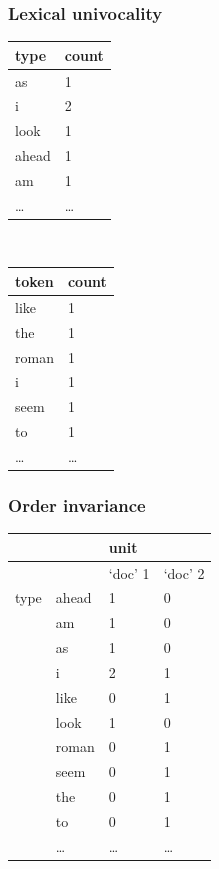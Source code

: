 \documentclass{hertieteaching}\usepackage[]{graphicx}\usepackage[]{color}
\begin{document}
\begin{frame}[t]\frametitle{Lexical univocality}

\begin{center}
{\small
\begin{tabular}{ll}\toprule
type & count\\ \midrule
as & 1\\
i & 2\\
look & 1\\
ahead & 1\\
am & 1\\
\ldots & \ldots\\ \bottomrule
\end{tabular}
~~~~~~~~~~
\begin{tabular}{ll}\toprule
token & count\\ \midrule
like & 1\\
the & 1\\
roman & 1\\
i & 1\\
seem & 1\\
to & 1\\
\ldots & \ldots\\ \bottomrule
\end{tabular}
}
\end{center}

\end{frame}
\begin{frame}[t]\frametitle{Order invariance}

\begin{center}
{\small
\begin{tabular}{rlll}\toprule
&         & unit    & \\ \midrule
&         & `doc' 1 & `doc' 2 \\ \midrule
type      & ahead   & 1    & 0 \\
& am      & 1    & 0 \\
& as      & 1    & 0 \\
& i       & 2    & 1 \\
& like    & 0    & 1\\
& look    & 1    & 0 \\
& roman   & 0    & 1 \\
& seem    & 0    & 1 \\
& the     & 0    & 1 \\
& to      & 0    & 1\\
& \ldots  & \ldots & \ldots \\ \bottomrule
\end{tabular}
}
\end{center}

\end{frame}
\end{document}
